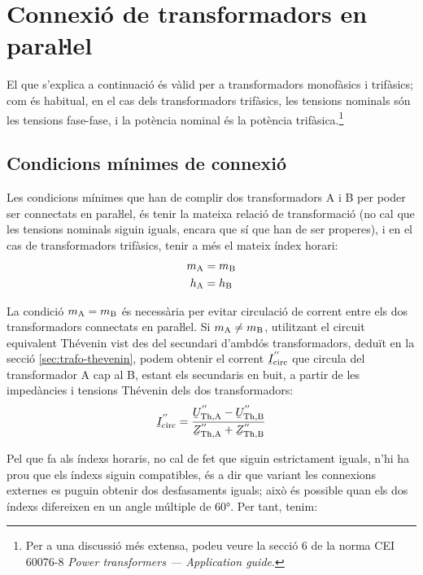 \section{\texorpdfstring{Connexió de transformadors en paraŀlel}{Connexió de transformadors en paral-lel}}

El que s'explica a continuació és vàlid per a transformadors
monofàsics i trifàsics; com és habitual, en el cas dels
transformadors trifàsics, les tensions nominals són les tensions
fase-fase, i la potència nominal és la potència trifàsica.\footnote{Per a una discussió més extensa,  podeu veure la secció 6 de la norma CEI 60076-8 \emph{Power transformers --- Application guide}.}

\subsection{Condicions mínimes de connexió}

Les condicions mínimes que han de complir dos transformadors A i B per poder ser connectats en paraŀlel, és tenir la mateixa relació de transformació (no cal que les tensions nominals siguin iguals, encara que sí que han de ser properes), i en el cas de transformadors trifàsics, tenir a més el mateix índex horari:
\begin{align}
    m_\mathrm{A} &= m_\mathrm{B}\\
    h_\mathrm{A} &= h_\mathrm{B}
\end{align}

La condició $m_\mathrm{A} = m_\mathrm{B}$ és necessària per evitar circulació de corrent entre els dos transformadors connectats en paraŀlel. Si $m_\mathrm{A} \neq m_\mathrm{B}$, utilitzant el circuit equivalent  Thévenin vist des del secundari d'ambdós transformadors, deduït en la secció \vref{sec:trafo-thevenin}, podem obtenir el corrent $\cmplx{I}\ped{circ}^{''}$ que circula del transformador A cap al B, estant els secundaris en buit, a partir de les impedàncies i tensions Thévenin dels dos transformadors:
\begin{equation}
    \cmplx{I}\ped{circ}^{''} = \frac{\cmplx{U}\ped{Th,A}^{''}-\cmplx{U}\ped{Th,B}^{''}}{\cmplx{Z}\ped{Th,A}^{''}+
    \cmplx{Z}\ped{Th,B}^{''}}
\end{equation}

Pel que fa als índexs horaris, no cal de fet que siguin estrictament iguals, n'hi ha prou  que els índexs siguin compatibles, és a dir que variant les connexions externes es puguin obtenir dos desfasaments iguals; això és possible quan els dos índexs difereixen en un angle múltiple de \ang{60}. Per tant, tenim:

